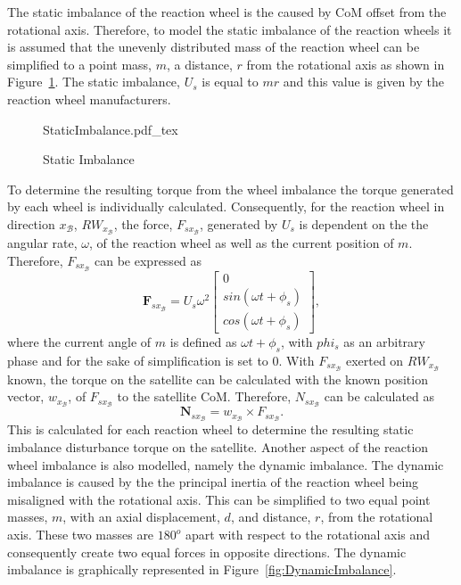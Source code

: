 The static imbalance of the reaction wheel is the caused by CoM offset from the rotational axis. Therefore, to model the static imbalance of the reaction wheels it is assumed that the unevenly distributed mass of the reaction wheel can be simplified to a point mass, $m$, a distance, $r$ from the rotational axis as shown in Figure~\ref{fig:StaticImbalance}. The static imbalance, $U_s$ is equal to $mr$ and this value is given by the reaction wheel manufacturers.
\begin{figure}[!htb]
	\centering
	\def\svgwidth{10cm}
	{StaticImbalance.pdf_tex}
	\label{fig:StaticImbalance}
	\caption{Static Imbalance}
\end{figure}
To determine the resulting torque from the wheel imbalance the torque generated by each wheel is individually calculated. Consequently, for the reaction wheel in direction $x_\mathcal{B}$, $RW_{x_\mathcal{B}}$, the force, $F_{sx_\mathcal{B}}$, generated by $U_s$ is dependent on the the angular rate, $\omega$, of the reaction wheel as well as the current position of $m$. Therefore, $F_{sx_\mathcal{B}}$ can be expressed as
\begin{equation}
\mathbf{F}_{sx_\mathcal{B}} = U_s\omega^2 \begin{bmatrix} 0 \\ sin(\omega t + \phi_s) \\ cos(\omega t + \phi_s)\end{bmatrix},
\end{equation}
where the current angle of $m$ is defined as $\omega t + \phi_s$, with $phi_s$ as an arbitrary phase and for the sake of simplification is set to $0$. With $F_{sx_\mathcal{B}}$ exerted on $RW_{x_\mathcal{B}}$ known, the torque on the satellite can be calculated with the known position vector, $w_{x_\mathcal{B}}$, of $F_{sx_\mathcal{B}}$ to the satellite CoM. Therefore, $N_{sx_\mathcal{B}}$ can be calculated as
\begin{equation}
\mathbf{N}_{sx_\mathcal{B}} = w_{x_\mathcal{B}} \times F_{sx_\mathcal{B}}.
\end{equation}
This is calculated for each reaction wheel to determine the resulting static imbalance disturbance torque on the satellite. Another aspect of the reaction wheel imbalance is also modelled, namely the dynamic imbalance. The dynamic imbalance is caused by the the principal inertia of the reaction wheel being misaligned with the rotational axis. This can be simplified to two equal point masses, $m$, with an axial displacement, $d$, and distance, $r$, from the rotational axis. These two masses are $\num{180}^o$ apart with respect to the rotational axis and consequently create two equal forces in opposite directions. The dynamic imbalance is graphically represented in Figure~\ref{fig:DynamicImbalance}.
